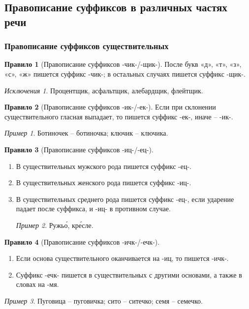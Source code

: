\documentclass[12pt]{article}
\theoremstyle{definition}
\newtheorem{rrule}{Правило}[section]
\theoremstyle{remark}
\newtheorem*{example}{Пример}
\newtheorem*{exception}{Исключения}
\begin{document}
\subsection{Правописание суффиксов в различных частях речи}

\subsubsection{Правописание суффиксов существительных}

\begin{rrule}[Правописание суффиксов -чик-/-щик-] После букв «д», «т», «з», «с», «ж» пишется суффикс -чик-; в остальных случаях пишется суффикс -щик-.
    \begin{exception}
        Процентщик, асфальтщик, алебардщик, флейтщик. 
    \end{exception}
\end{rrule}

\begin{rrule}[Правописание суффиксов -ик-/-ек-]
    Если при склонении существительного гласная выпадает, то пишется суффикс -ек-, иначе – -ик-.
    \begin{example}
        Ботиночек -- ботиночка; ключик -- ключика.
    \end{example}
\end{rrule}

\begin{rrule}[Правописание суффиксов -иц-/-ец-]
    \hfill
    \begin{enumerate}
        \item В существительных мужского рода пишется суффикс -ец-.
        \item В существительных женского рода пишется суффикс -иц-.
        \item В существительных среднего рода пишется суффикс -ец-, если ударение падает после суффикса, и -иц- в противном случае.
        \begin{example}
            Ружь\'{о}, кр\'{е}сле.
        \end{example}
    \end{enumerate}
\end{rrule}

\begin{rrule}[Правописание суффиксов -ичк-/-ечк-]
    \hfill
    \begin{enumerate}
        \item Если основа существительного оканчивается на -иц, то пишется -ичк-.
        \item Суффикс -ечк- пишется в существительных с другими основами, а также в словах на -мя. 
    \end{enumerate}
    \begin{example}
        Пуговица -- пуговичка; сито -- ситечко; семя -- семечко.
    \end{example}
\end{rrule}
\end{document}
